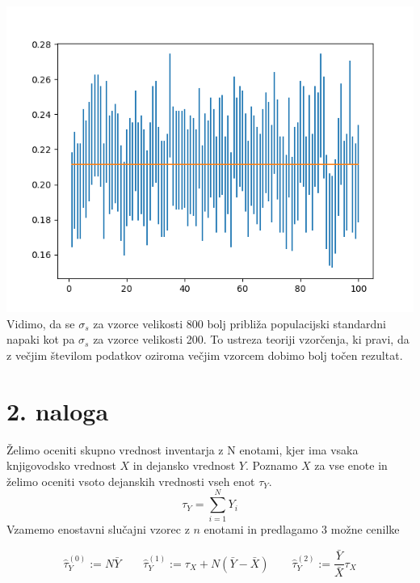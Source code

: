 \documentclass[A4paper, 11pt]{article}
\begin{document}
\includegraphics[scale=0.8]{Kibergrad_2}
%
Vidimo, da se $\sigma_s$ za vzorce velikosti 800 bolj približa populacijski standardni napaki kot pa $\sigma_s$ za vzorce velikosti 200. To ustreza teoriji vzorčenja, ki pravi, da z večjim številom podatkov oziroma večjim vzorcem dobimo bolj točen rezultat. 

\newpage


\section*{2. naloga}

Želimo oceniti skupno vrednost inventarja z N enotami, kjer ima vsaka knjigovodsko vrednost $X$ in dejansko vrednost $Y$. Poznamo $X$ za vse enote in želimo oceniti vsoto dejanskih vrednosti vseh enot $\tau_Y$.
\[ \tau_Y = \sum_{i=1}^{N} Y_i \]
Vzamemo enostavni slučajni vzorec z $n$ enotami in predlagamo 3 možne cenilke

\[ \hat{\tau}_Y ^ {(0)} := N  \bar{Y} \qquad \hat{\tau}_Y ^ {(1)} := \tau_X + N ( \bar{Y} - \bar{X}) \qquad \hat{\tau}_Y ^ {(2)} := \frac{\bar{Y}}{\bar{X}} \tau_X \]
\end{document}
